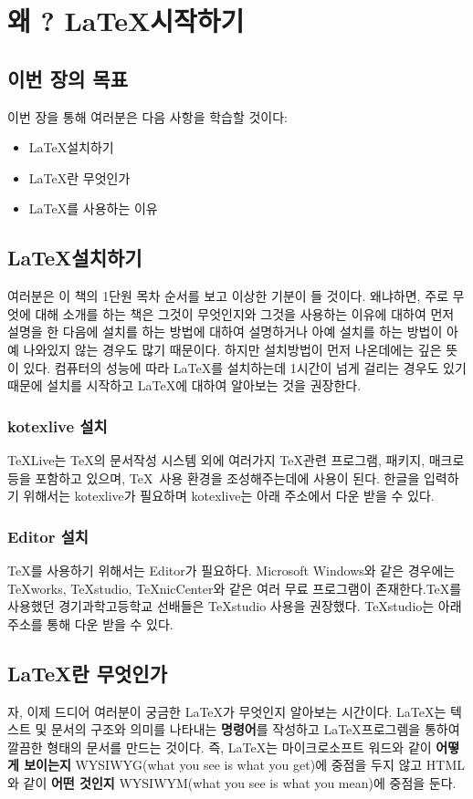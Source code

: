 \documentclass[12pt]{article}
\begin{document}
	\section{왜 ? \LaTeX 시작하기}
	\subsection{이번 장의 목표}
	이번 장을 통해 여러분은 다음 사항을 학습할 것이다:
	\begin{itemize}
		\item \LaTeX 설치하기
		\item \LaTeX 란 무엇인가
		\item \LaTeX 를 사용하는 이유
	\end{itemize}
	
	\subsection{\LaTeX 설치하기}
	여러분은 이 책의 1단원 목차 순서를 보고 이상한 기분이 들 것이다. 왜냐하면, 주로 무엇에 대해 소개를 하는 책은 그것이 무엇인지와 그것을 사용하는 이유에 대하여 먼저 설명을 한 다음에 설치를 하는 방법에 대하여 설명하거나 아예 설치를 하는 방법이 아예 나와있지 않는 경우도 많기 때문이다. 하지만 설치방법이 먼저 나온데에는 깊은 뜻이 있다. 컴퓨터의 성능에 따라 \LaTeX 를 설치하는데 1시간이 넘게 걸리는 경우도 있기 때문에 설치를 시작하고 \LaTeX 에 대하여 알아보는 것을 권장한다.
	\subsubsection{kotexlive 설치}
	\TeX Live는 \TeX 의 문서작성 시스템 외에 여러가지 \TeX 관련 프로그램, 패키지, 매크로 등을 포함하고 있으며, \TeX\ 사용 환경을 조성해주는데에 사용이 된다. 한글을 입력하기 위해서는 kotexlive가 필요하며 kotexlive는 아래 주소에서 다운 받을 수 있다.
	\subsubsection{Editor 설치}
	\TeX 를 사용하기 위해서는 Editor가 필요하다. Microsoft Windows와 같은 경우에는 TeXworks, TeXstudio, TeXnicCenter와 같은 여러 무료 프로그램이 존재한다.\TeX 를 사용했던 경기과학고등학교 선배들은 TeXstudio 사용을 권장했다. TeXstudio는 아래 주소를 통해 다운 받을 수 있다.
	\subsection{\LaTeX 란 무엇인가}
	자, 이제 드디어 여러분이 궁금한 \LaTeX 가 무엇인지 알아보는 시간이다. \LaTeX 는 텍스트 및 문서의 구조와 의미를 나타내는 {\bf 명령어}를 작성하고 \LaTeX 프로그렘을 통하여 깔끔한 형태의 문서를 만드는 것이다. 즉, \LaTeX 는 마이크로소프트 워드와 같이 {\bf 어떻게 보이는지} WYSIWYG(what you see is what you get)에 중점을 두지 않고 HTML와 같이 {\bf 어떤 것인지} WYSIWYM(what you see is what you mean)에 중점을 둔다.
\end{document}
